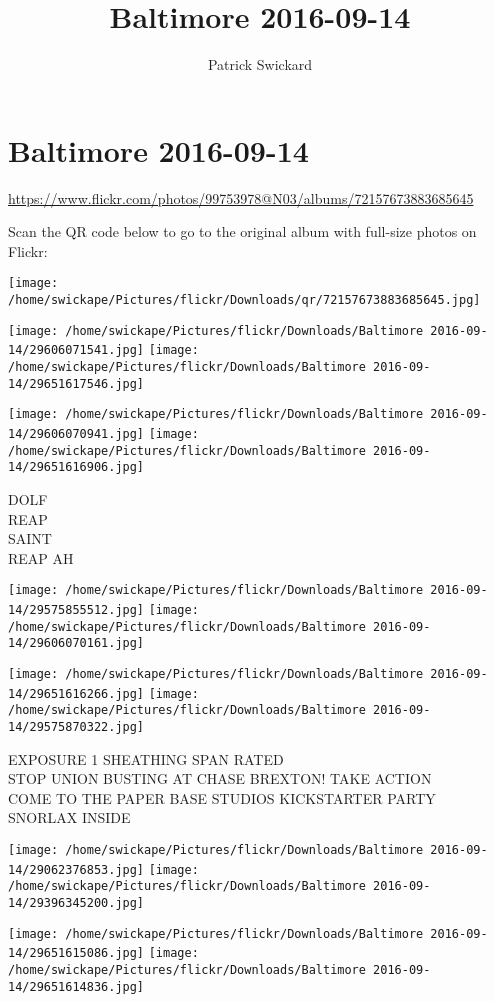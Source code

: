 \documentclass[10pt,letterpaper]{article}
\title{Baltimore 2016-09-14}
\author{Patrick Swickard}
\date{}
\begin{document}
\section*{Baltimore 2016-09-14}

\url{https://www.flickr.com/photos/99753978@N03/albums/72157673883685645}

Scan the QR code below to go to the original album with full-size photos on Flickr:

\texttt{[image: /home/swickape/Pictures/flickr/Downloads/qr/72157673883685645.jpg]}
\pagebreak

\texttt{[image: /home/swickape/Pictures/flickr/Downloads/Baltimore 2016-09-14/29606071541.jpg]}
\texttt{[image: /home/swickape/Pictures/flickr/Downloads/Baltimore 2016-09-14/29651617546.jpg]}

\texttt{[image: /home/swickape/Pictures/flickr/Downloads/Baltimore 2016-09-14/29606070941.jpg]}
\texttt{[image: /home/swickape/Pictures/flickr/Downloads/Baltimore 2016-09-14/29651616906.jpg]}

DOLF\\
REAP\\
SAINT\\
REAP AH
\pagebreak

\texttt{[image: /home/swickape/Pictures/flickr/Downloads/Baltimore 2016-09-14/29575855512.jpg]}
\texttt{[image: /home/swickape/Pictures/flickr/Downloads/Baltimore 2016-09-14/29606070161.jpg]}

\texttt{[image: /home/swickape/Pictures/flickr/Downloads/Baltimore 2016-09-14/29651616266.jpg]}
\texttt{[image: /home/swickape/Pictures/flickr/Downloads/Baltimore 2016-09-14/29575870322.jpg]}

EXPOSURE 1 SHEATHING SPAN RATED\\
STOP UNION BUSTING AT CHASE BREXTON!   TAKE ACTION\\
COME TO THE PAPER BASE STUDIOS KICKSTARTER PARTY\\
SNORLAX INSIDE
\pagebreak

\texttt{[image: /home/swickape/Pictures/flickr/Downloads/Baltimore 2016-09-14/29062376853.jpg]}
\texttt{[image: /home/swickape/Pictures/flickr/Downloads/Baltimore 2016-09-14/29396345200.jpg]}

\texttt{[image: /home/swickape/Pictures/flickr/Downloads/Baltimore 2016-09-14/29651615086.jpg]}
\texttt{[image: /home/swickape/Pictures/flickr/Downloads/Baltimore 2016-09-14/29651614836.jpg]}
\end{document}
